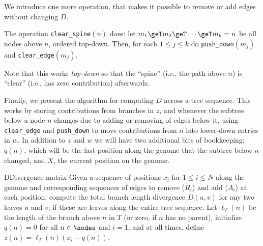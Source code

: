 We introduce one more operation, that makes it possible to remove or add edges
without changing $D$.

\begin{definition}
    The operation \texttt{clear\_spine}$(n)$ does:
    let $m_1 \geT m_2 \geT \cdots \geT m_k = n$ be all nodes above $n$, ordered top-down.
    Then, for each $1 \le j \le k$ do \texttt{push\_down}$(m_j)$ and \texttt{clear\_edge}$(m_j)$.
\end{definition}

Note that this works \emph{top-down} so that the ``spine'' (i.e., the path above $n$)
is ``clear'' (i.e., has zero contribution) afterwards.

Finally, we present the algorithm for computing $D$ across a tree sequence.
%
This works by storing contributions from branches in $z$,
and whenever the subtree below a node $n$ changes due to adding or removing of edges below it,
using \texttt{clear\_edge} and \texttt{push\_down} to move contributions from $n$
into lower-down entries in $w$.
%
In addition to $z$ and $w$ we will have two additional bits of bookkeeping:
$q(n)$, which will be the last position along the genome that the subtree below $n$ changed,
and $X$, the current position on the genome.

\begin{taocpalg}{D}{Divergence matrix}
{
    Given a sequence of positions $x_i$ for $1 \le i \le N$ along the genome
    and corresponding sequences of edges to remove ($R_i$) and add ($A_i$) at each position,
    compute the total branch length divergence $D(u, v)$ for any two leaves $u$ and $v$,
    if these are leaves along the entire tree sequence.
    Let $\ell_T(n)$ be the length of the branch above $n$ in $T$ (or zero, if $n$ has no parent),
    initialize $q(n) = 0$ for all $n \in \nodes$ and $i = 1$,
    and at all times, define $z(n) = \ell_T(n) (x_i - q(n))$.
}





\end{taocpalg}

